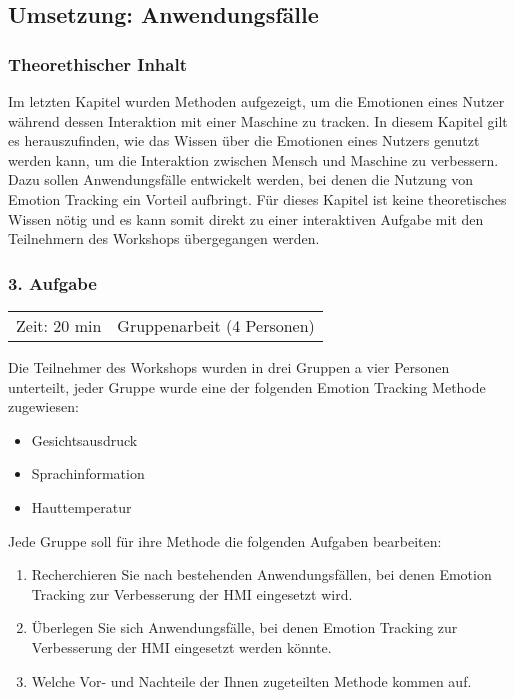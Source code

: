 \subsection{Umsetzung: Anwendungsfälle}\label{Umsetzung_Anwendungsfaelle}
\subsubsection*{Theorethischer Inhalt}
Im letzten Kapitel wurden Methoden aufgezeigt, um die Emotionen eines Nutzer während dessen Interaktion mit einer Maschine zu tracken. In diesem Kapitel gilt es herauszufinden, wie das Wissen über die Emotionen eines Nutzers genutzt werden kann, um die Interaktion zwischen Mensch und Maschine zu verbessern. Dazu sollen Anwendungsfälle entwickelt werden, bei denen die Nutzung von Emotion Tracking ein Vorteil aufbringt. Für dieses Kapitel ist keine theoretisches Wissen nötig und es kann somit direkt zu einer interaktiven Aufgabe mit den Teilnehmern des Workshops übergegangen werden.
\newline
\subsubsection*{3. Aufgabe}
\begin{tabular}{c c }
	Zeit: 20 min & Gruppenarbeit (4 Personen)\\
\end{tabular}

Die Teilnehmer des Workshops wurden in drei Gruppen a vier Personen unterteilt, jeder Gruppe wurde eine der folgenden Emotion Tracking Methode zugewiesen:
\begin{itemize}
	\item Gesichtsausdruck
	\item Sprachinformation
	\item Hauttemperatur
\end{itemize}

Jede Gruppe soll für ihre Methode die folgenden Aufgaben bearbeiten:
\begin{enumerate}
	\item Recherchieren Sie nach bestehenden Anwendungsfällen, bei denen Emotion Tracking zur Verbesserung der \ac{HMI} eingesetzt wird.
	\item Überlegen Sie sich Anwendungsfälle, bei denen Emotion Tracking zur Verbesserung der \ac{HMI} eingesetzt werden könnte.
	\item Welche Vor- und Nachteile der Ihnen zugeteilten Methode kommen auf.
\end{enumerate}
\vspace{2mm}
